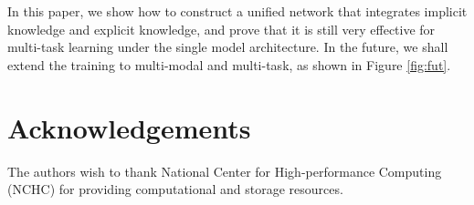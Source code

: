\documentclass[10pt,twocolumn,letterpaper]{article}
\begin{document}
In this paper, we show how to construct a unified network that integrates implicit knowledge and explicit knowledge, and prove that it is still very effective for multi-task learning under the single model architecture. In the future, we shall extend the training to multi-modal and multi-task, as shown in Figure \ref{fig:fut}.

\section{Acknowledgements}

The authors wish to thank National Center for High-performance Computing (NCHC) for
providing computational and storage resources.



\clearpage
\clearpage
\clearpage
\end{document}
